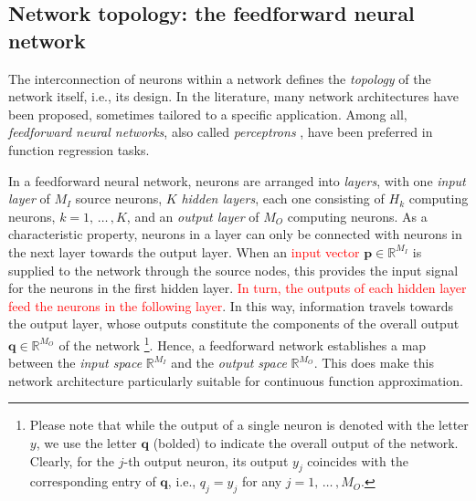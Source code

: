 \documentclass[longtitle]{elsarticle}
\numberwithin{equation}{section}
\theoremstyle{theorem}
\theoremstyle{definition}
\theoremstyle{remark}
\theoremstyle{proposition}
\numberwithin{figure}{section}
\begin{document}
		
	
	\subsection{Network topology: the feedforward neural network}
	\label{section:Network topology}
	
		The interconnection of neurons within a network defines the \emph{topology} of the network itself, i.e., its design. In the literature, many network architectures have been proposed, sometimes tailored to a specific application. Among all, \emph{feedforward neural networks}, also called \emph{perceptrons} \cite{Ros58}, have been preferred in function regression tasks.
		
		In a feedforward neural network, neurons are arranged into \emph{layers}, with one \emph{input layer} of $M_I$ source neurons, $K$ \emph{hidden layers}, each one consisting of $H_k$ computing neurons, $k = 1, \, \ldots \, , K$, and an \emph{output layer} of $M_O$ computing neurons. As a characteristic property, neurons in a layer can only be connected with neurons in the next layer towards the output layer. When an \textcolor{red}{input vector} $\mathbf{p} \in \mathbb{R}^{M_I}$ is supplied to the network through the source nodes, this provides the input signal for the neurons in the first hidden layer. \textcolor{red}{In turn, the outputs of each hidden layer feed the neurons in the following layer}. In this way, information travels towards the output layer, whose outputs constitute the components of the overall output $\mathbf{q} \in \mathbb{R}^{M_O}$ of the network \footnote{Please note that while the output of a single neuron is denoted with the letter $y$, we use the letter $\mathbf{q}$ (bolded) to indicate the overall output of the network. Clearly, for the $j$-th output neuron, its output $y_j$ coincides with the corresponding entry of $\mathbf{q}$, i.e., $q_j = y_j$ for any $j = 1, \, \ldots \, , M_O$.}. Hence, a feedforward network establishes a map between the \emph{input space} $\mathbb{R}^{M_I}$ and the \emph{output space} $\mathbb{R}^{M_O}$. This does make this network architecture particularly suitable for continuous function approximation.
		
\end{document}
